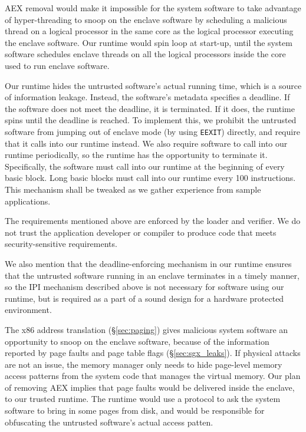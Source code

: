 AEX removal would make it impossible for the system software to take advantage
of hyper-threading to snoop on the enclave software by scheduling a malicious
thread on a logical processor in the same core as the logical processor
executing the enclave software. Our runtime would spin loop at start-up, until
the system software schedules enclave threads on all the logical processors
inside the core used to run enclave software.

Our runtime hides the untrusted software's actual running time, which is a
source of information leakage. Instead, the software's metadata specifies a
deadline. If the software does not meet the deadline, it is terminated. If it
does, the runtime spins until the deadline is reached. To implement this, we
prohibit the untrusted software from jumping out of enclave mode (by using
\texttt{EEXIT}) directly, and require that it calls into our runtime instead.
We also require software to call into our runtime periodically, so the runtime
has the opportunity to terminate it. Specifically, the software must call into
our runtime at the beginning of every basic block. Long basic blocks must call
into our runtime every 100 instructions. This mechanism shall be tweaked as we
gather experience from sample applications.

The requirements mentioned above are enforced by the loader and verifier. We do
not trust the application developer or compiler to produce code that meets
security-sensitive requirements.

We also mention that the deadline-enforcing mechanism in our runtime ensures
that the untrusted software running in an enclave terminates in a timely
manner, so the IPI mechanism described above is not necessary for software
using our runtime, but is required as a part of a sound design for a hardware
protected environment.

The x86 address translation (\S \ref{sec:paging}) gives malicious system
software an opportunity to snoop on the enclave software, because of the
information reported by page faults and page table flags
(\S \ref{sec:sgx_leaks}). If physical attacks are not an issue, the memory
manager only needs to hide page-level memory access patterns from the system
code that manages the virtual memory. Our plan of removing AEX implies that
page faults would be delivered inside the enclave, to our trusted runtime. The
runtime would use a protocol to ask the system software to bring in some pages
from disk, and would be responsible for obfuscating the untrusted software's
actual access patten.


